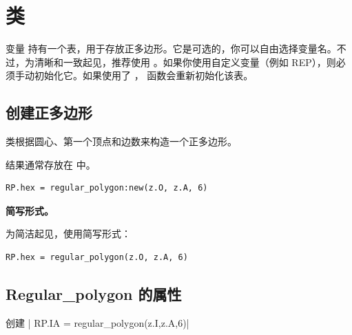 \newpage
\section{ 类}

变量  持有一个表，用于存放正多边形。它是可选的，你可以自由选择变量名。不过，为清晰和一致起见，推荐使用 。如果你使用自定义变量（例如 REP），则必须手动初始化它。如果使用了 ， 函数会重新初始化该表。


\subsection{创建正多边形}

 类根据圆心、第一个顶点和边数来构造一个正多边形。

\medskip
结果通常存放在  中。

\begin{mybox}
\begin{verbatim}
RP.hex = regular_polygon:new(z.O, z.A, 6)
\end{verbatim}
\end{mybox}

\textbf{简写形式。}

为简洁起见，使用简写形式：

\begin{mybox}
\begin{verbatim}
RP.hex = regular_polygon(z.O, z.A, 6)
\end{verbatim}
\end{mybox}

\subsection{Regular\_polygon 的属性}
\label{sub:regular_polygon_attributes}

\begin{mybox}
创建 | RP.IA = regular_polygon(z.I,z.A,6)|
\end{mybox}


